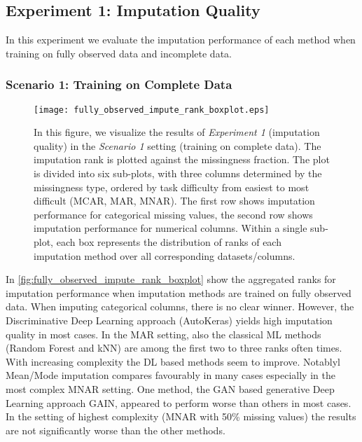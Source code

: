 

\subsection{Experiment 1: Imputation Quality}

In this experiment we evaluate the imputation performance of each method when training on fully observed data and incomplete data. 

\subsubsection{Scenario 1: Training on Complete Data}

\begin{figure}\centering
    \texttt{[image: fully\_observed\_impute\_rank\_boxplot.eps]}
    \caption[Imputation Ranks - Fully Observed]{In this figure, we visualize the results of \textit{Experiment 1} (imputation quality) in the \textit{Scenario 1} setting (training on complete data). The imputation rank is plotted against the missingness fraction. The plot is divided into six sub-plots, with three columns determined by the missingness type, ordered by task difficulty from easiest to most difficult (MCAR, MAR, MNAR). The first row shows imputation performance for categorical missing values,  the second row shows imputation performance for numerical columns. Within a single sub-plot, each box represents the distribution of ranks of each imputation method over all corresponding datasets/columns.}\label{fig:fully_observed_impute_rank_boxplot}
\end{figure}

In  \autoref{fig:fully_observed_impute_rank_boxplot} show the aggregated ranks for imputation performance when imputation methods are trained on fully observed data.
When imputing categorical columns, there is no clear winner. However, the Discriminative Deep Learning approach (AutoKeras) yields high imputation quality in most cases. In the MAR setting, also the classical ML methods (Random Forest and kNN) are among the first two to three ranks often times. With increasing complexity the DL based methods seem to improve. Notablyl Mean/Mode imputation compares favourably in many cases especially in the most complex MNAR setting. One method, the GAN based generative Deep Learning approach GAIN, appeared to perform worse than others in most cases. In the setting of highest complexity (MNAR with 50\% missing values) the results are not significantly worse than the other methods.

